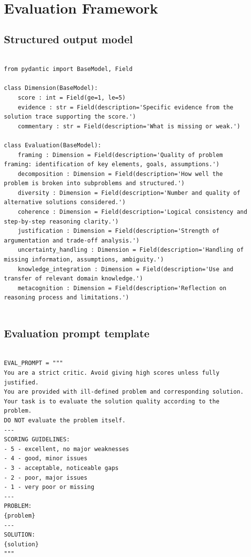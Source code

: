 \section[\appendixname~\thesection]{Evaluation Framework}

\subsection[\appendixname~\thesubsection]{Structured output model} \label{appendix:structured_output}

\begin{lstlisting}[breaklines, basicstyle=\ttfamily\small]

from pydantic import BaseModel, Field

class Dimension(BaseModel):
    score : int = Field(ge=1, le=5)
    evidence : str = Field(description='Specific evidence from the solution trace supporting the score.')
    commentary : str = Field(description='What is missing or weak.')

class Evaluation(BaseModel):
    framing : Dimension = Field(description='Quality of problem framing: identification of key elements, goals, assumptions.')
    decomposition : Dimension = Field(description='How well the problem is broken into subproblems and structured.')
    diversity : Dimension = Field(description='Number and quality of alternative solutions considered.')
    coherence : Dimension = Field(description='Logical consistency and step-by-step reasoning clarity.')
    justification : Dimension = Field(description='Strength of argumentation and trade-off analysis.')
    uncertainty_handling : Dimension = Field(description='Handling of missing information, assumptions, ambiguity.')
    knowledge_integration : Dimension = Field(description='Use and transfer of relevant domain knowledge.')
    metacognition : Dimension = Field(description='Reflection on reasoning process and limitations.')
    
\end{lstlisting}

\subsection[\appendixname~\thesubsection]{Evaluation prompt template} \label{appendix:evaluation_prompt}

\begin{lstlisting}[breaklines, basicstyle=\ttfamily\small]

EVAL_PROMPT = """
You are a strict critic. Avoid giving high scores unless fully justified.
You are provided with ill-defined problem and corresponding solution.
Your task is to evaluate the solution quality according to the problem.
DO NOT evaluate the problem itself.
---
SCORING GUIDELINES:
- 5 - excellent, no major weaknesses
- 4 - good, minor issues
- 3 - acceptable, noticeable gaps
- 2 - poor, major issues
- 1 - very poor or missing
---
PROBLEM:
{problem}
---
SOLUTION:
{solution}
"""

\end{lstlisting}